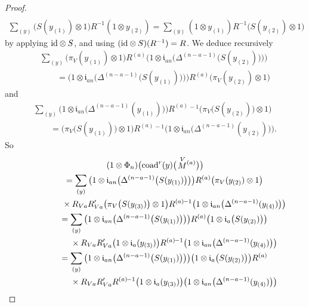 \documentclass[pdftex]{sigma}%
\numberwithin{equation}{section}
\numberwithin{figure}{section}
\begin{document}
\begin{proof}
\begin{gather*}
\\
\sum_{(y)} \big( S(y_{(1)}) \otimes 1\big)R^{-1}(1 \otimes y_{(2)}) = \sum_{(y)} (1 \otimes y_{(1)}) R^{-1}\big(S(y_{(2)}) \otimes 1\big)
\end{gather*}
by applying ${\rm id} \otimes S$, and using $({\rm id} \otimes S)(R^{-1}) = R$. We deduce recursively
\begin{gather*}
\sum_{(y)}\big(\pi_V(y_{(1)}) \otimes 1\big) R^{(a)} \big(1 \otimes \mathfrak{i}_{an}\big(\Delta^{(n-a-1)}\big( S(y_{(2)})\big)\big)\big)
\\ \qquad
{}= \big(1 \otimes \mathfrak{i}_{an}\big(\Delta^{(n-a-1)}\big( S(y_{(1)})\big)\big) \big) R^{(a)} \big(\pi_V(y_{(2)}) \otimes 1\big)
\end{gather*}
and
\begin{gather*}
\sum_{(y)} \big(1 \otimes \mathfrak{i}_{an}\big(\Delta^{(n-a-1)}(y_{(1)})\big)\big) R^{(a)}{}^{\!-1} \big(\pi_V\big( S(y_{(2)})\big) \otimes 1\big)
\\ \qquad
{}= \big(\pi_V\big( S(y_{(1)})\big) \otimes 1\big) R^{(a)}{}^{\!-1} \big(1 \otimes \mathfrak{i}_{an}\big(\Delta^{(n-a-1)}(y_{(2)})\big)\big).
\end{gather*}
So
\begin{gather*}
(1 \otimes \Phi_n) \big(\!\operatorname{coad}^r(y) \big(\!\stackrel{V}{M}{}^{\!\! (a)}\big) \big)
\\ \qquad
{}= \sum_{(y)} \big(1 \otimes \mathfrak{i}_{an}\big(\Delta^{(n-a-1)}\big( S(y_{(1)})\big)\big)\big) R^{(a)} \big(\pi_V(y_{(2)}) \otimes 1\big)
\\ \qquad\hphantom{=\sum_{(y)}}
{} \times R_{Va}R_{Va}' \big(\pi_V\big( S(y_{(3)})\big) \otimes 1\big) R^{(a)}{}^{\!-1} \big(1 \otimes \mathfrak{i}_{an}\big(\Delta^{(n-a-1)}(y_{(4)})\big)\big)
\\ \qquad
{} = \sum_{(y)} \big(1 \otimes \mathfrak{i}_{an}\big(\Delta^{(n-a-1)}\big( S(y_{(1)})\big)\big)\big) R^{(a)} \big(1 \otimes \mathfrak{i}_{a}\big( S(y_{(2)})\big)\big)
\\ \qquad\hphantom{=\sum_{(y)}}
{} \times R_{Va}R_{Va}'\big(1 \otimes \mathfrak{i}_{a}(y_{(3)})\big) R^{(a)}{}^{\!-1} \big(1 \otimes \mathfrak{i}_{an}\big(\Delta^{(n-a-1)}(y_{(4)})\big)\big)
\\ \qquad
{} = \sum_{(y)} \big(1 \otimes \mathfrak{i}_{an}\big(\Delta^{(n-a-1)}\big( S(y_{(1)})\big)\big) \big) \big(1 \otimes \mathfrak{i}_{a}\big( S(y_{(2)})\big)\big) R^{(a)}
\\ \qquad\hphantom{=\sum_{(y)}}
{} \times R_{Va}R_{Va}' R^{(a)}{}^{\!-1} \big(1 \otimes \mathfrak{i}_{a}(y_{(3)})\big) \big(1 \otimes \mathfrak{i}_{an}\big(\Delta^{(n-a-1)}(y_{(4)})\big)\big)

\end{gather*}
\end{proof}
\end{document}
